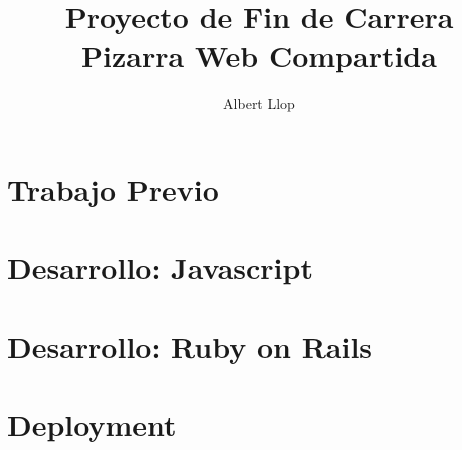 \documentclass [11pt]{report}
\begin{document}
\author{Albert Llop}
\title{\Huge{\textbf{Proyecto de Fin de Carrera} \\ Pizarra Web Compartida}}
\maketitle
\newpage
\tableofcontents

\chapter{Trabajo Previo}

\newpage

\newpage

\newpage



\chapter{Desarrollo: Javascript}

\newpage

\newpage

\newpage




\chapter{Desarrollo: Ruby on Rails}

\newpage

\newpage

\newpage

\newpage

\newpage

\newpage



\chapter{Deployment}

\newpage

\end{document}
